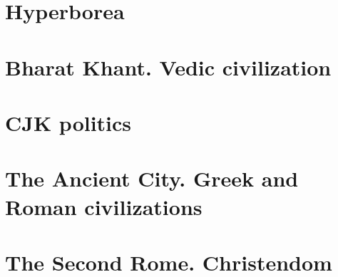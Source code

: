 \documentclass[a4paper,12pt,twoside]{book}
\begin{document}
\chapter{Hyperborea}





\chapter{Bharat Khant. Vedic civilization}


\chapter{CJK politics}


\chapter{The Ancient City. Greek and Roman civilizations}













\chapter{The Second Rome. Christendom}








\end{document}
